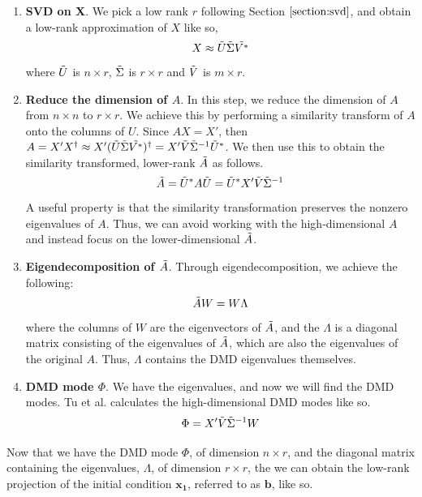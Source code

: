 \documentclass[letterpaper, 10 pt, conference]{ieeeconf}  %
\begin{document}
\begin{enumerate}
\item{\textbf{SVD on X}.
We pick a low rank $r$ following Section $\ref{section:svd}$, and obtain a low-rank approximation of $X$ like so, 
\begin{equation}
X \approx \Tilde{U} \Tilde{\Sigma}\Tilde{V^*}
\end{equation}
where $\Tilde{U}$ is $n \times r$, $\Tilde{\Sigma}$ is $r \times r$ and $\Tilde{V}$ is $m \times r$.
}

\item{\textbf{Reduce the dimension of $A$}.
In this step, we reduce the dimension of $A$ from $n \times n$ to $r \times r$. We achieve this by performing a similarity transform of $A$ onto the columns of $U$. Since $AX = X'$, then $A = X' X^{\dagger} \approx X' ( \Tilde{U} \Tilde{\Sigma}\Tilde{V^*})^\dagger =  X' \Tilde{V} \Tilde{\Sigma}^{-1}\Tilde{U}^*$. We then use this to obtain the similarity transformed, lower-rank $\Tilde{A}$ as follows.
\begin{equation}
\Tilde{A} = \Tilde{U}^*A \Tilde{U} = \Tilde{U}^*X' \Tilde{V} \Tilde{\Sigma}^{-1}
\end{equation}
A useful property is that the similarity transformation preserves the nonzero eigenvalues of $A$. Thus, we can avoid working with the high-dimensional $A$ and instead focus on the lower-dimensional $\Tilde{A}$.
}

\item{}\textbf{Eigendecomposition of $\Tilde{A}$}.
Through eigendecomposition, we achieve the following:
\begin{equation}
    \Tilde{A}W = W\Lambda
\end{equation}
where the columns of $W$ are the eigenvectors of $\Tilde{A}$, and the $\Lambda$ is a diagonal matrix consisting of the eigenvalues of $\Tilde{A}$, which are also the eigenvalues of the original $A$. Thus, $\Lambda$ contains the DMD eigenvalues themselves.

\item{\textbf{DMD mode $\Phi$}. We have the eigenvalues, and now we will find the DMD modes. Tu et al. \cite{tu2013dmd} calculates the high-dimensional DMD modes like so.
}
\begin{equation}
    \Phi = X' \Tilde{V} \Tilde{\Sigma}^{-1} W
\end{equation}
\end{enumerate}

Now that we have the DMD mode $\Phi$, of dimension $n \times r$, and the diagonal matrix containing the eigenvalues, $\Lambda$, of dimension $r \times r$, the we can obtain the low-rank projection of the initial condition $\bm{x_1}$, referred to as $\bm{b}$, like so.
\end{document}
